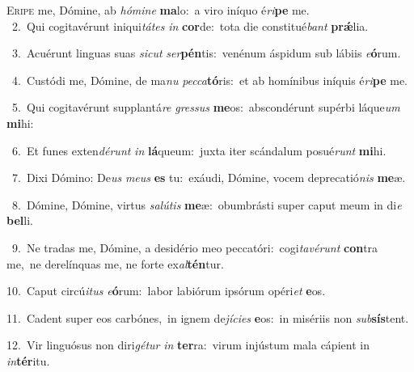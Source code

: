 \lettrine{\initial\textcolor{\initialcolor}{E}}{ripe} me, Dómine, ab \textit{hó}\-\textit{mi}\textit{ne} \textbf{ma}\-lo:~\star a viro iníquo é\-\textit{ri}\-\textbf{pe} me.\\
{\numbfont\textcolor{\numbcolor}{~2.}}~Qui cogitavérunt iniqui\-\textit{tá}\-\textit{tes} \textit{in} \textbf{cor}\-de:~\star tota die constitué\textit{bant} \textbf{prǽ}\-lia.\par
{\numbfont\textcolor{\numbcolor}{~3.}}~Acuérunt linguas suas \textit{sic}\-\textit{ut} \textit{ser}\-\textbf{pén}tis:~\star venénum áspidum sub lábiis \textit{e}\-\textbf{ó}rum.\par
{\numbfont\textcolor{\numbcolor}{~4.}}~Custódi me, Dómine, de ma\textit{nu} \textit{pec}\-\textit{ca}\textbf{tó}ris:~\star et ab homínibus iníquis é\-\textit{ri}\-\textbf{pe} me.\par
{\numbfont\textcolor{\numbcolor}{~5.}}~Qui cogitavérunt supplantá\textit{re} \textit{gres}\-\textit{sus} \textbf{me}\-os:~\star abscondérunt supérbi láque\textit{um} \textbf{mi}\-hi:\par
{\numbfont\textcolor{\numbcolor}{~6.}}~Et funes exten\-\textit{dé}\-\textit{runt} \textit{in} \textbf{lá}\-queum:~\star juxta iter scándalum posué\textit{runt} \textbf{mi}\-hi.\par
{\numbfont\textcolor{\numbcolor}{~7.}}~Dixi Dómino: De\textit{us} \textit{me}\-\textit{us} \textbf{es} tu:~\star exáudi, Dómine, vocem deprecatió\textit{nis} \textbf{me}\-æ.\par
{\numbfont\textcolor{\numbcolor}{~8.}}~Dómine, Dómine, virtus \textit{sa}\-\textit{lú}\textit{tis} \textbf{me}\-æ:~\star obumbrásti super caput meum in di\textit{e} \textbf{bel}\-li.\par
{\numbfont\textcolor{\numbcolor}{~9.}}~Ne tradas me, Dómine, a desidério meo peccatóri:~\dagger cogi\-\textit{ta}\-\textit{vé}\textit{runt} \textbf{con}\-tra me,~\star ne derelínquas me, ne forte ex\-\textit{al}\-\textbf{tén}tur.\par
{\numbfont\textcolor{\numbcolor}{10.}}~Caput circú\-\textit{i}\-\textit{tus} \textit{e}\-\textbf{ó}rum:~\star labor labiórum ipsórum opéri\textit{et} \textbf{e}\-os.\par
{\numbfont\textcolor{\numbcolor}{11.}}~Cadent super eos carbónes,~\dagger in ignem de\-\textit{jí}\-\textit{ci}\textit{es} \textbf{e}\-os:~\star in misériis non \textit{sub}\-\textbf{sís}tent.\par
{\numbfont\textcolor{\numbcolor}{12.}}~Vir linguósus non diri\-\textit{gé}\-\textit{tur} \textit{in} \textbf{ter}\-ra:~\star virum injústum mala cápient in \textit{in}\-\textbf{tér}itu.\par
